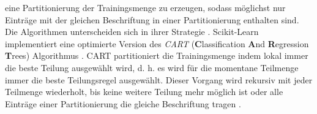 eine Partitionierung der Trainingsmenge zu erzeugen, sodass möglichst nur Einträge mit der gleichen Beschriftung in einer Partitionierung enthalten sind. Die Algorithmen unterscheiden
sich in ihrer Strategie \cite{quinlan1986induction}.
\newline
\newline
Scikit-Learn implementiert eine optimierte Version des \textit{CART} (\textbf{C}lassification \textbf{A}nd \textbf{R}egression \textbf{T}rees) Algorithmus \cite{ScikitLearnCART}.
CART partitioniert die Trainingsmenge indem lokal immer die beste Teilung ausgewählt wird, d. h. es wird für die momentane Teilmenge immer die beste Teilungsregel ausgewählt.
Dieser Vorgang wird rekursiv mit jeder Teilmenge wiederholt, bis keine weitere Teilung mehr möglich ist oder alle Einträge einer Partitionierung die gleiche Beschriftung tragen \cite{steinbergCART}.